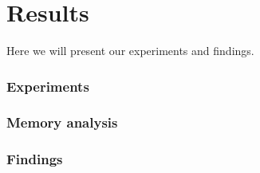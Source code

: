 \section{Results}
Here we will present our experiments and findings. 
\subsubsection{Experiments}
\subsubsection{Memory analysis}
\subsubsection{Findings}
